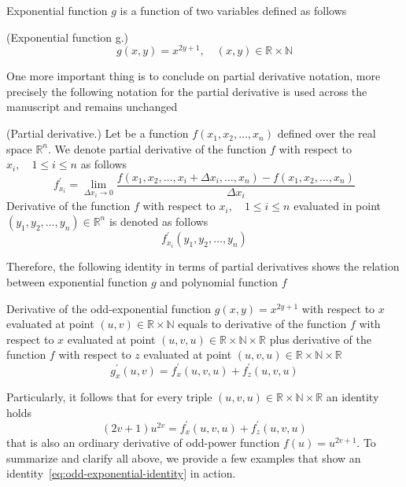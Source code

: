 Exponential function $g$ is a function of two variables defined as follows
\begin{definition}(Exponential function g.)
    \begin{equation}
        g(x, y) = x^{2y + 1}, \quad (x,y) \in \mathbb{R}\times\mathbb{N}
        \label{eq:definition-g}
    \end{equation}
\end{definition}
One more important thing is to conclude on partial derivative notation,
more precisely the following notation for the partial derivative is used across the manuscript and remains unchanged
\begin{notation} (Partial derivative.)
    Let be a function $f(x_1, x_2, \dots, x_n)$ defined over the real space $\mathbb{R}^n$.
    We denote partial derivative of the function $f$ with respect to $x_i, \quad 1 \leq i \leq n$ as follows
    \begin{equation*}
        f^{'}_{x_i} = \lim_{\Delta x_i \to 0} \frac{f(x_1, x_2, \dots, x_i + \Delta x_i, \dots, x_n) - f(x_1, x_2, \dots, x_n)}{\Delta x_i}
    \end{equation*}
    Derivative of the function $f$ with respect to $x_i, \quad 1 \leq i \leq n$
    evaluated in point $(y_1, y_2, \dots, y_n) \in \mathbb{R}^n$ is denoted as follows
    \begin{equation*}
        f^{'}_{x_i} (y_1, y_2, \dots, y_n)
    \end{equation*}
\end{notation}
Therefore, the following identity in terms of partial derivatives shows the relation between exponential function $g$ and
polynomial function $f$
\begin{thm}
    Derivative of the odd-exponential function $g(x, y) = x^{2y + 1}$ with respect to $x$ evaluated
    at point $(u,v) \in \mathbb{R} \times \mathbb{N}$
    equals to derivative of the function $f$ with respect to $x$ evaluated
    at point $(u,v,u) \in \mathbb{R} \times \mathbb{N} \times \mathbb{R}$ plus
    derivative of the function $f$ with respect to $z$ evaluated
    at point $(u,v,u) \in \mathbb{R} \times \mathbb{N} \times \mathbb{R}$
    \begin{equation}
        g^{'}_{x} (u, v) = f^{'}_{x} (u, v, u) + f^{'}_{z} (u, v, u)
        \label{eq:odd-exponential-identity}
    \end{equation}
\end{thm}
Particularly, it follows that for every triple $(u,v,u) \in \mathbb{R} \times \mathbb{N} \times \mathbb{R}$ an identity holds
\begin{equation}
    \label{eq:equation}
    (2v+1)u^{2v} = f^{'}_{x} (u, v, u) + f^{'}_{z} (u, v, u)
\end{equation}
that is also an ordinary derivative of odd-power function $f(u)=u^{2v+1}$.
To summarize and clarify all above, we provide a few examples that show an identity~\eqref{eq:odd-exponential-identity}
in action.
